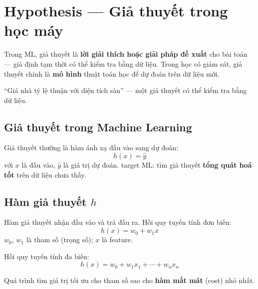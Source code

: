 \section{Hypothesis --- Giả thuyết trong học máy}
\label{sec:hypothesis}

\begin{dinhnghia}[title={Hypothesis (giả thuyết)}]
Trong ML, giả thuyết là \textbf{lời giải thích hoặc giải pháp đề xuất} cho bài toán --- giả định tạm thời có thể kiểm tra bằng dữ liệu.
Trong học có giám sát, giả thuyết chính là \textbf{mô hình} thuật toán học để dự đoán trên dữ liệu mới.
\end{dinhnghia}

\begin{ynghia}[title={Ví dụ đời thường}]
``Giá nhà tỷ lệ thuận với diện tích sàn'' --- một giả thuyết có thể kiểm tra bằng dữ liệu.
\end{ynghia}

\subsection{Giả thuyết trong Machine Learning}

\begin{ynghia}[title={Hàm giả thuyết}]
Giả thuyết thường là hàm ánh xạ đầu vào sang dự đoán:
\[
h(x) = \hat{y}
\]
với $x$ là đầu vào, $\hat{y}$ là giá trị dự đoán.
target ML: tìm giả thuyết \textbf{tổng quát hoá tốt} trên dữ liệu chưa thấy.
\end{ynghia}

\subsection{Hàm giả thuyết $h$}

\begin{dinhnghia}[title={Hypothesis function}]
Hàm giả thuyết nhận đầu vào và trả đầu ra.
Hồi quy tuyến tính đơn biến:
\[
h(x) = w_0 + w_1 x
\]
$w_0$, $w_1$ là tham số (trọng số); $x$ là feature.

Hồi quy tuyến tính đa biến:
\[
h(x) = w_0 + w_1 x_1 + \cdots + w_n x_n
\]
\end{dinhnghia}

\begin{phuongphap}[title={Huấn luyện}]
Quá trình tìm giá trị tối ưu cho tham số sao cho \textbf{hàm mất mát} (cost) nhỏ nhất.
\end{phuongphap}

